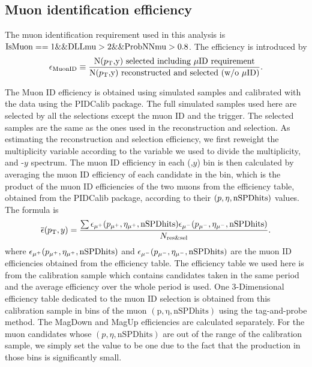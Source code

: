 \subsection{Muon identification efficiency}
The muon identification requirement used in this analysis is ${\rm IsMuon}==1\&\& {\rm DLLmu}>2 \&\& {\rm ProbNNmu}>0.8$. 
The efficiency is introduced by 
\begin{equation}
\epsilon_{\mathrm{MuonID}}    \equiv \frac{\mbox{N($p_{\mathrm{T}}$,y) selected including $\mu$ID requirement}}{\mbox{N($p_{\mathrm{T}}$,y) reconstructed and selected (w/o $\mu$ID)}}.
\end{equation}

The Muon ID efficiency is obtained using simulated samples and calibrated with the data using the PIDCalib package.
The full simulated samples used here are selected by all the selections except the muon ID and the trigger.
The selected samples are the same as the ones used in the reconstruction and selection.
As estimating the reconstruction and selection efficiency, we first reweight the multiplicity variable according to the variable we used to divide the multiplicity, and \pt-$y$ spectrum.
The muon ID efficiency in each (\pt,$y$) bin is then calculated by averaging the muon ID efficiency of each candidate in the bin, which is the product of the muon ID efficiencies of the two muons from the efficiency table, obtained from the PIDCalib package, according to their $(p,\eta,{\rm nSPDhits})$ values. 
The formula is
\begin{equation}
\overline{\epsilon}(p_{\mathrm{T}},y)=\frac{\sum \epsilon_{\mu^+}(p_{\mu^+},\eta_{\mu^+},\mathrm{nSPDhits})\epsilon_{\mu^-}(p_{\mu^-},\eta_{\mu^-},\mathrm{nSPDhits})}{N_\mathrm{res\&sel}}.
\label{eq:muonid}
\end{equation}
where $\epsilon_{\mu^+}(p_{\mu^+},\eta_{\mu^+},\mathrm{nSPDhits})$ and $\epsilon_{\mu^-}(p_{\mu^-},\eta_{\mu^-},\mathrm{nSPDhits})$ are the muon ID efficiencies obtained from the efficiency table.
The efficiency table we used here is from the calibration sample which contains \jpsi candidates taken in the same period and the average efficiency over the whole period is used.
One 3-Dimensional efficiency table dedicated to the muon ID selection is obtained from this calibration sample in bins of the muon $\mathrm{(p,\eta,\mathrm{nSPDhits})}$ using the tag-and-probe method.
The MagDown and MagUp efficiencies are calculated separately.
For the muon candidates whose $(p, \eta,\mathrm{nSPDhits})$ are out of the range of the calibration sample, we simply set the value to be one due to the fact that the production in those bins is significantly small.
